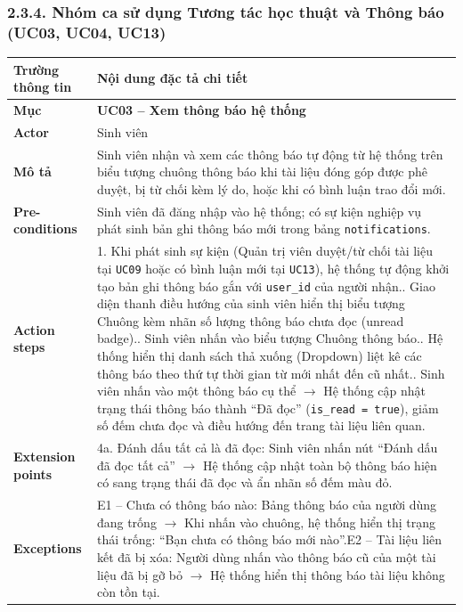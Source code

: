 

\subsubsection{2.3.4. Nhóm ca sử dụng Tương tác học thuật và Thông báo (UC03, UC04, UC13)}

\begin{table}[H]
\centering
\footnotesize\linespread{1.05}\selectfont
\setlength{\tabcolsep}{5pt}
\renewcommand{\arraystretch}{1.12}
\begin{tabularx}{\textwidth}{|p{3.5cm}|X|}
\hline
\rowcolor[HTML]{EAEAEA}
\textbf{Trường thông tin} & \textbf{Nội dung đặc tả chi tiết} \\
\hline
\textbf{Mục} & \textbf{UC03 -- Xem thông báo hệ thống} \\
\hline
\textbf{Actor} & Sinh viên \\
\hline
\textbf{Mô tả} & Sinh viên nhận và xem các thông báo tự động từ hệ thống trên biểu tượng chuông thông báo khi tài liệu đóng góp được phê duyệt, bị từ chối kèm lý do, hoặc khi có bình luận trao đổi mới. \\
\hline
\textbf{Pre-conditions} & Sinh viên đã đăng nhập vào hệ thống; có sự kiện nghiệp vụ phát sinh bản ghi thông báo mới trong bảng \texttt{notifications}. \\
\hline
\textbf{Action steps} & 1. Khi phát sinh sự kiện (Quản trị viên duyệt/từ chối tài liệu tại \texttt{UC09} hoặc có bình luận mới tại \texttt{UC13}), hệ thống tự động khởi tạo bản ghi thông báo gắn với \texttt{user\_id} của người nhận.\newline 2. Giao diện thanh điều hướng của sinh viên hiển thị biểu tượng Chuông kèm nhãn số lượng thông báo chưa đọc (unread badge).\newline 3. Sinh viên nhấn vào biểu tượng Chuông thông báo.\newline 4. Hệ thống hiển thị danh sách thả xuống (Dropdown) liệt kê các thông báo theo thứ tự thời gian từ mới nhất đến cũ nhất.\newline 5. Sinh viên nhấn vào một thông báo cụ thể $\rightarrow$ Hệ thống cập nhật trạng thái thông báo thành ``Đã đọc'' (\texttt{is\_read = true}), giảm số đếm chưa đọc và điều hướng đến trang tài liệu liên quan. \\
\hline
\textbf{Extension points} & 4a. Đánh dấu tất cả là đã đọc: Sinh viên nhấn nút ``Đánh dấu đã đọc tất cả'' $\rightarrow$ Hệ thống cập nhật toàn bộ thông báo hiện có sang trạng thái đã đọc và ẩn nhãn số đếm màu đỏ. \\
\hline
\textbf{Exceptions} & E1 -- Chưa có thông báo nào: Bảng thông báo của người dùng đang trống $\rightarrow$ Khi nhấn vào chuông, hệ thống hiển thị trạng thái trống: ``Bạn chưa có thông báo mới nào''.\newline E2 -- Tài liệu liên kết đã bị xóa: Người dùng nhấn vào thông báo cũ của một tài liệu đã bị gỡ bỏ $\rightarrow$ Hệ thống hiển thị thông báo tài liệu không còn tồn tại. \\

\end{tabularx}
\end{table}
